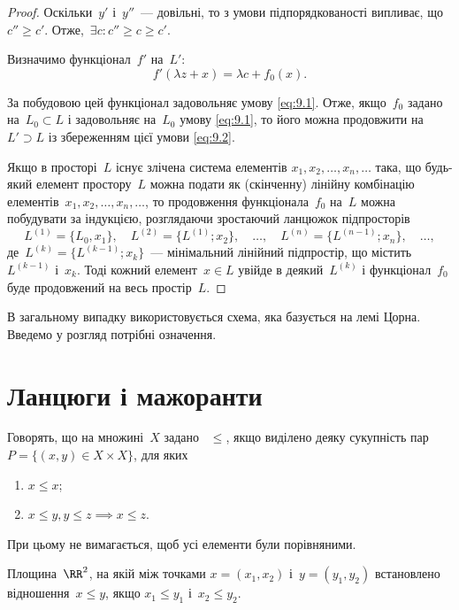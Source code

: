\begin{proof}
Оскільки~$y'$ і~$y''$~--- довільні, то з умови підпорядкованості
випливає, що~$c'' \ge c'$. Отже,~$\exists c: c'' \ge c \ge c'$.

Визначимо функціонал~$f'$ на~$L'$:
\begin{equation*}
    f'(\lambda z + x) = \lambda c + f_0(x).
\end{equation*}

За побудовою цей функціонал задовольняє умову \eqref{eq:9.1}. Отже,
якщо~$f_0$ задано на~$L_0 \subset L$ і задовольняє на~$L_0$ умову \eqref{eq:9.1}, то
його можна продовжити на~$L' \supset L$ із збереженням цієї умови \eqref{eq:9.2}.

Якщо в просторі~$L$ існує злічена система елементів
$x_1, x_2, \dots, x_n, \dots$ така, що будь-який елемент простору~$L$ можна
подати як (скінченну) лінійну комбінацію елементів~$x_1, x_2, \dots, x_n, \dots$, то
продовження функціонала~$f_0$ на~$L$ можна побудувати за
індукцією, розглядаючи зростаючий ланцюжок підпросторів
\begin{equation*}
    L^{(1)} = \{L_0, x_1\}, \quad L^{(2)} = \{L^{(1)}; x_2\}, \quad \dots, \quad L^{(n)} = \{L^{(n - 1)}; x_n\}, \quad \dots,
\end{equation*}
де~$L^{(k)} = \{L^{(k - 1)}; x_k\}$~--- мінімальний лінійний підпростір, що
містить~$L^{(k - 1)}$ і~$x_k$. Тоді кожний елемент~$x \in L$ увійде в
деякий~$L^{(k)}$ і функціонал~$f_0$ буде продовжений на весь
простір~$L$. 
\end{proof}

В загальному випадку використовується схема,
яка базується на лемі Цорна. Введемо у розгляд потрібні
означення.

\section{Ланцюги і мажоранти}

\begin{definition}
Говорять, що на множині~$X$ задано ~$\le$, якщо виділено деяку сукупність пар
$P = \{(x, y) \in X \times X\}$, для яких
\begin{enumerate}
    \item $x \le x$;
    \item $x \le y, y \le z \implies x \le z$.
\end{enumerate}
При цьому не вимагається, щоб усі елементи були порівняними.
\end{definition}

\begin{example}
Площина~$\RR^2$, на якій між точками
$x = (x_1, x_2)$ і~$y = (y_1, y_2)$
встановлено відношення~$x \le y$, якщо
$x_1 \le y_1$ і~$x_2 \le y_2$.
\end{example}

